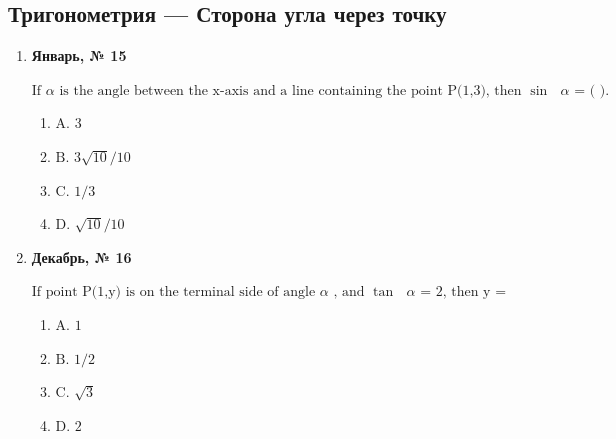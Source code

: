 \subsection*{Тригонометрия — Сторона угла через точку}
\begin{enumerate}
\item \textbf{Январь, № 15} \par \smallskip
$\displaystyle \text{If }\alpha\text{  is the angle between the x-axis and a line containing the point P(1,3), then }\sin\text{ }\alpha\text{  = ( ).}$
\begin{enumerate}
\item $\displaystyle \text{A. 3}$
\item $\displaystyle \text{B. 3}\sqrt{10}\text{/10}$
\item $\displaystyle \text{C. 1/3}$
\item $\displaystyle \text{D. }\sqrt{10}\text{/10}$
\end{enumerate}
\item \textbf{Декабрь, № 16} \par \smallskip
$\displaystyle \text{If point P(1,y) is on the terminal side of angle }\alpha\text{ , and }\tan\text{ }\alpha\text{  = 2, then y =}$
\begin{enumerate}
\item $\displaystyle \text{A. 1}$
\item $\displaystyle \text{B. 1/2}$
\item $\displaystyle \text{C. }\sqrt{3}$
\item $\displaystyle \text{D. 2}$
\end{enumerate}
\end{enumerate}

